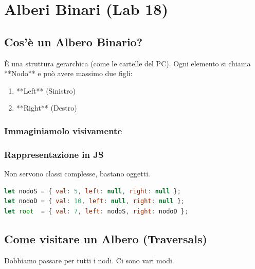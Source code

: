 \section{Alberi Binari (Lab 18)}

\subsection{Cos'è un Albero Binario?}
È una struttura gerarchica (come le cartelle del PC).
Ogni elemento si chiama **Nodo** e può avere massimo due figli:
\begin{enumerate}
    \item **Left** (Sinistro)
    \item **Right** (Destro)
\end{enumerate}

\subsubsection{Immaginiamolo visivamente}
\begin{center}
\end{center}

\subsubsection{Rappresentazione in JS}
Non servono classi complesse, bastano oggetti.
\begin{lstlisting}[language=JavaScript]
let nodoS = { val: 5, left: null, right: null };
let nodoD = { val: 10, left: null, right: null };
let root  = { val: 7, left: nodoS, right: nodoD };
\end{lstlisting}

\subsection{Come visitare un Albero (Traversals)}
Dobbiamo passare per tutti i nodi. Ci sono vari modi.

